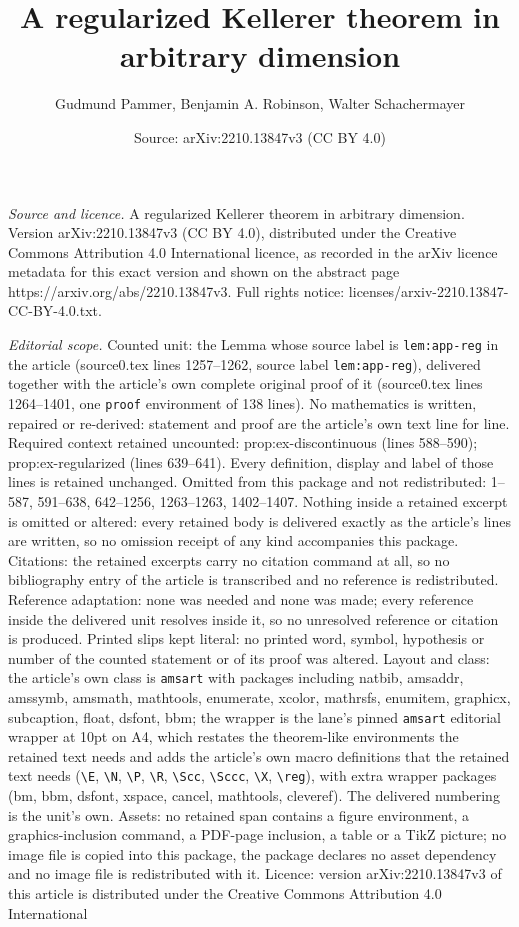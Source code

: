 \documentclass[10pt,a4paper]{amsart}
\title[A regularized Kellerer theorem in arbitrary dimension]{A regularized Kellerer theorem in arbitrary dimension}
\author{Gudmund Pammer, Benjamin A. Robinson, Walter Schachermayer}
\date{Source: arXiv:2210.13847v3 (CC BY 4.0)}
\begin{document}
\maketitle

\noindent\emph{Source and licence.} A regularized Kellerer theorem in arbitrary dimension. Version arXiv:2210.13847v3 (CC BY 4.0), distributed under the Creative Commons Attribution 4.0 International licence, as recorded in the arXiv licence metadata for this exact version and shown on the abstract page https://arxiv.org/abs/2210.13847v3. Full rights notice: licenses/arxiv-2210.13847-CC-BY-4.0.txt.\par\smallskip

\noindent\textit{Editorial scope.} Counted unit: the Lemma whose source label is \texttt{lem:app-reg} in the article (source0.tex lines 1257--1262, source label \texttt{lem:app-reg}), delivered together with the article's own complete original proof of it (source0.tex lines 1264--1401, one \texttt{proof} environment of 138 lines). No mathematics is written, repaired or re-derived: statement and proof are the article's own text line for line. Required context retained uncounted: prop:ex-discontinuous (lines 588--590); prop:ex-regularized (lines 639--641). Every definition, display and label of those lines is retained unchanged. Omitted from this package and not redistributed: 1--587, 591--638, 642--1256, 1263--1263, 1402--1407. Nothing inside a retained excerpt is omitted or altered: every retained body is delivered exactly as the article's lines are written, so no omission receipt of any kind accompanies this package. Citations: the retained excerpts carry no citation command at all, so no bibliography entry of the article is transcribed and no reference is redistributed. Reference adaptation: none was needed and none was made; every reference inside the delivered unit resolves inside it, so no unresolved reference or citation is produced. Printed slips kept literal: no printed word, symbol, hypothesis or number of the counted statement or of its proof was altered. Layout and class: the article's own class is \texttt{amsart} with packages including natbib, amsaddr, amssymb, amsmath, mathtools, enumerate, xcolor, mathrsfs, enumitem, graphicx, subcaption, float, dsfont, bbm; the wrapper is the lane's pinned \texttt{amsart} editorial wrapper at 10pt on A4, which restates the theorem-like environments the retained text needs and adds the article's own macro definitions that the retained text needs (\texttt{\textbackslash E}, \texttt{\textbackslash N}, \texttt{\textbackslash P}, \texttt{\textbackslash R}, \texttt{\textbackslash Scc}, \texttt{\textbackslash Sccc}, \texttt{\textbackslash X}, \texttt{\textbackslash reg}), with extra wrapper packages (bm, bbm, dsfont, xspace, cancel, mathtools, cleveref). The delivered numbering is the unit's own. Assets: no retained span contains a figure environment, a graphics-inclusion command, a PDF-page inclusion, a table or a TikZ picture; no image file is copied into this package, the package declares no asset dependency and no image file is redistributed with it. Licence: version arXiv:2210.13847v3 of this article is distributed under the Creative Commons Attribution 4.0 International 
\end{document}

